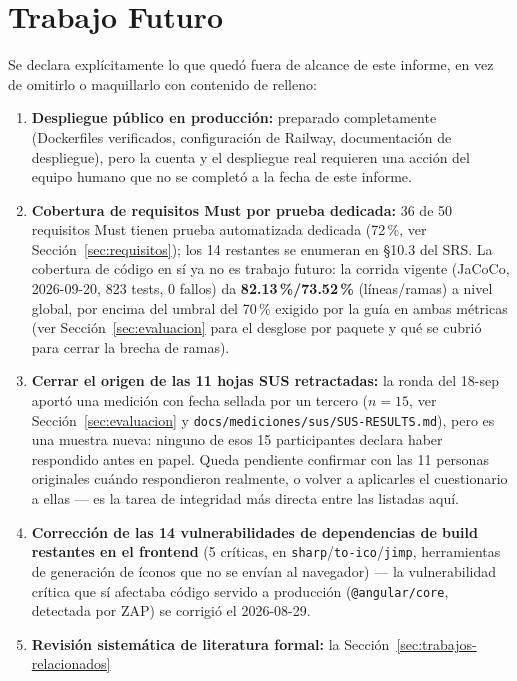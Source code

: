 \section{Trabajo Futuro}
\label{sec:trabajo-futuro}

Se declara explícitamente lo que quedó fuera de alcance de este informe, en vez de omitirlo o
maquillarlo con contenido de relleno:

\begin{enumerate}[nosep]
    \item \textbf{Despliegue público en producción:} preparado completamente (Dockerfiles verificados,
    configuración de Railway, documentación de despliegue), pero la cuenta y el despliegue real requieren
    una acción del equipo humano que no se completó a la fecha de este informe.
    \item \textbf{Cobertura de requisitos Must por prueba dedicada:} 36 de 50 requisitos Must tienen
    prueba automatizada dedicada (72\,\%, ver Sección~\ref{sec:requisitos}); los 14 restantes se
    enumeran en \S10.3 del SRS. La cobertura de código en sí ya no es trabajo futuro: la corrida vigente
    (JaCoCo, 2026-09-20, 823 tests, 0 fallos) da \textbf{82.13\,\%/73.52\,\%} (líneas/ramas) a nivel
    global, por encima del umbral del 70\,\% exigido por la guía en ambas métricas (ver
    Sección~\ref{sec:evaluacion} para el desglose por paquete y qué se cubrió para cerrar la brecha de
    ramas).
    \item \textbf{Cerrar el origen de las 11 hojas SUS retractadas:} la ronda del 18-sep aportó una
    medición con fecha sellada por un tercero ($n=15$, ver Sección~\ref{sec:evaluacion} y
    \texttt{docs/mediciones/sus/SUS-RESULTS.md}), pero es una muestra nueva: ninguno de esos 15
    participantes declara haber respondido antes en papel. Queda pendiente confirmar con las 11
    personas originales cuándo respondieron realmente, o volver a aplicarles el cuestionario a ellas
    --- es la tarea de integridad más directa entre las listadas aquí.
    \item \textbf{Corrección de las 14 vulnerabilidades de dependencias de build restantes en el
    frontend} (5 críticas, en \texttt{sharp}/\texttt{to-ico}/\texttt{jimp}, herramientas de generación
    de íconos que no se envían al navegador) --- la vulnerabilidad crítica que sí afectaba código
    servido a producción (\texttt{@angular/core}, detectada por ZAP) se corrigió el 2026-08-29.
    \item \textbf{Revisión sistemática de literatura formal:} la Sección~\ref{sec:trabajos-relacionados}

\end{enumerate}
